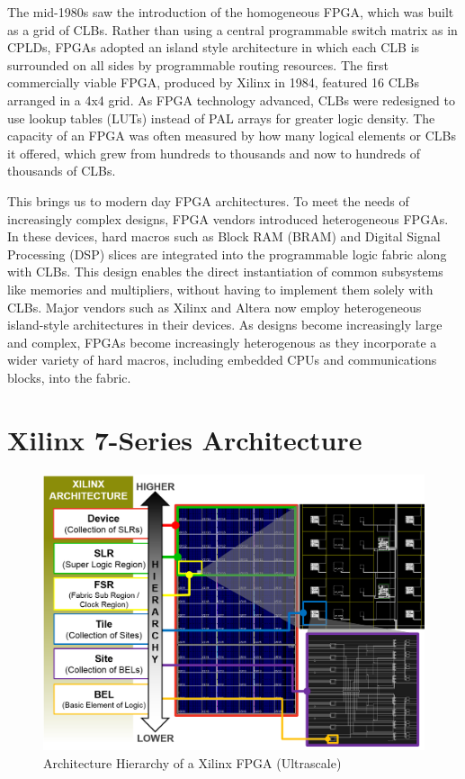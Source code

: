 \documentclass[twocolumn]{article}
\begin{document}
    The mid-1980s saw the introduction of the homogeneous FPGA, which was built as a grid of CLBs. 
    Rather than using a central programmable switch matrix as in CPLDs, FPGAs adopted an island style architecture in which each CLB is surrounded on all sides by programmable routing resources. 
    The first commercially viable FPGA, produced by Xilinx in 1984, featured 16 CLBs arranged in a 4x4 grid. 
    As FPGA technology advanced, CLBs were redesigned to use lookup tables (LUTs) instead of PAL arrays for greater logic density. 
    The capacity of an FPGA was often measured by how many logical elements or CLBs it offered, which grew from hundreds to thousands and now to hundreds of thousands of CLBs.

    This brings us to modern day FPGA architectures.
    To meet the needs of increasingly complex designs, FPGA vendors introduced heterogeneous FPGAs. 
    In these devices, hard macros such as Block RAM (BRAM) and Digital Signal Processing (DSP) slices are integrated into the programmable logic fabric along with CLBs. 
    This design enables the direct instantiation of common subsystems like memories and multipliers, without having to implement them solely with CLBs. 
    Major vendors such as Xilinx and Altera now employ heterogeneous island-style architectures in their devices. 
    As designs become increasingly large and complex, FPGAs become increasingly heterogenous as they incorporate a wider variety of hard macros, including embedded CPUs and communications blocks, into the fabric.

\section{Xilinx 7-Series Architecture}

    \begin{figure}
        \centering
        \includegraphics[width=\textwidth]{figures/hierarchy.png}
        \caption{Architecture Hierarchy of a Xilinx FPGA (Ultrascale)}
        \label{fig:hierarchy}
    \end{figure}
\end{document}
